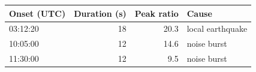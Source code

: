 \begin{tabular}{@{}lrrl@{}}
\toprule
Onset (UTC) & Duration (s) & Peak ratio & Cause \\ \midrule
03:12:20 & 18 & 20.3 & local earthquake \\
10:05:00 & 12 & 14.6 & noise burst \\
11:30:00 & 12 & 9.5 & noise burst \\
\bottomrule
\end{tabular}
